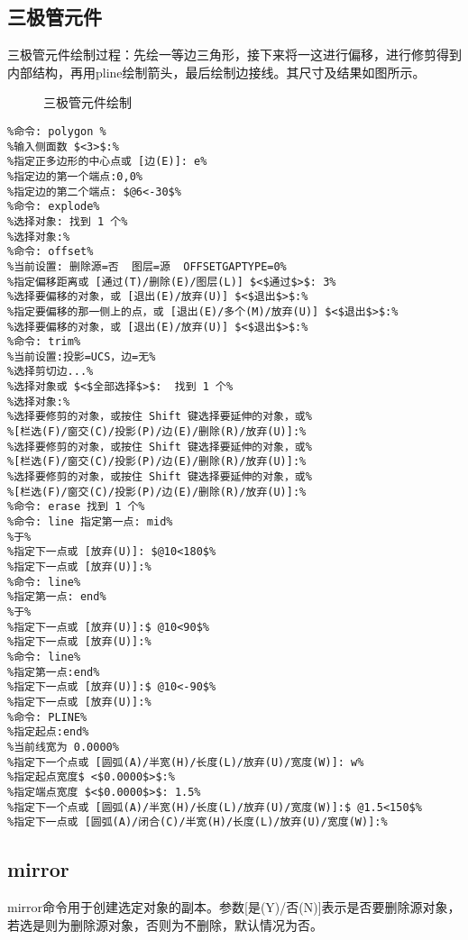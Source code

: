 \subsection{三极管元件}
三极管元件绘制过程：先绘一等边三角形，接下来将一这进行偏移，进行修剪得到内部结构，再用pline绘制箭头，最后绘制边接线。其尺寸及结果如图所示。

\noindent
\begin{figure}[htbp]
\centering
{}\hspace{30pt}
\hspace{30pt}
\caption{三极管元件绘制}
\end{figure}

\begin{lstlisting}
%命令: polygon %
%输入侧面数 $<3>$:%
%指定正多边形的中心点或 [边(E)]: e%
%指定边的第一个端点:0,0%
%指定边的第二个端点: $@6<-30$%
%命令: explode%
%选择对象: 找到 1 个%
%选择对象:%
%命令: offset%
%当前设置: 删除源=否  图层=源  OFFSETGAPTYPE=0%
%指定偏移距离或 [通过(T)/删除(E)/图层(L)] $<$通过$>$: 3%
%选择要偏移的对象，或 [退出(E)/放弃(U)] $<$退出$>$:%
%指定要偏移的那一侧上的点，或 [退出(E)/多个(M)/放弃(U)] $<$退出$>$:%
%选择要偏移的对象，或 [退出(E)/放弃(U)] $<$退出$>$:%
%命令: trim%
%当前设置:投影=UCS，边=无%
%选择剪切边...%
%选择对象或 $<$全部选择$>$:  找到 1 个%
%选择对象:%
%选择要修剪的对象，或按住 Shift 键选择要延伸的对象，或%
%[栏选(F)/窗交(C)/投影(P)/边(E)/删除(R)/放弃(U)]:%
%选择要修剪的对象，或按住 Shift 键选择要延伸的对象，或%
%[栏选(F)/窗交(C)/投影(P)/边(E)/删除(R)/放弃(U)]:%
%选择要修剪的对象，或按住 Shift 键选择要延伸的对象，或%
%[栏选(F)/窗交(C)/投影(P)/边(E)/删除(R)/放弃(U)]:%
%命令: erase 找到 1 个%
%命令: line 指定第一点: mid%
%于%
%指定下一点或 [放弃(U)]: $@10<180$%
%指定下一点或 [放弃(U)]:%
%命令: line%
%指定第一点: end%
%于%
%指定下一点或 [放弃(U)]:$ @10<90$%
%指定下一点或 [放弃(U)]:%
%命令: line%
%指定第一点:end%
%指定下一点或 [放弃(U)]:$ @10<-90$%
%指定下一点或 [放弃(U)]:%
%命令: PLINE%
%指定起点:end%
%当前线宽为 0.0000%
%指定下一个点或 [圆弧(A)/半宽(H)/长度(L)/放弃(U)/宽度(W)]: w%
%指定起点宽度$ <$0.0000$>$:%
%指定端点宽度 $<$0.0000$>$: 1.5%
%指定下一个点或 [圆弧(A)/半宽(H)/长度(L)/放弃(U)/宽度(W)]:$ @1.5<150$%
%指定下一点或 [圆弧(A)/闭合(C)/半宽(H)/长度(L)/放弃(U)/宽度(W)]:%
\end{lstlisting}
\subsection{mirror}
mirror命令用于创建选定对象的副本。参数[是(Y)/否(N)]表示是否要删除源对象，若选是则为删除源对象，否则为不删除，默认情况为否。
